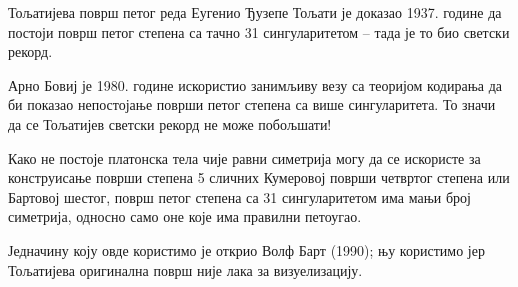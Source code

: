 \begin{surferPage}{Тољатијева површ петог реда}
    Еугенио Ђузепе Тољати је доказао 1937. године да постоји површ петог степена са тачно 
	31 сингуларитетом – тада је то био светски рекорд.


    Арно Бовиј је 1980. године искористио занимљиву везу са теоријом кодирања да би 
	показао непостојање површи петог степена са више сингуларитета. 
    То значи да се Тољатијев светски рекорд не може побољшати!

    Како не постоје платонска тела чије равни симетрија могу да се искористе за 
	конструисање површи степена 5 сличних Кумеровој површи четвртог степена или 
	Бартовој шестог, површ петог степена са 31 сингуларитетом има мањи број симетрија, 
	односно само оне које има правилни петоугао.


 Једначину коју овде користимо је открио Волф Барт (1990); њу користимо јер 
 Тољатијева оригинална површ није лака за визуелизацију.
\end{surferPage}
